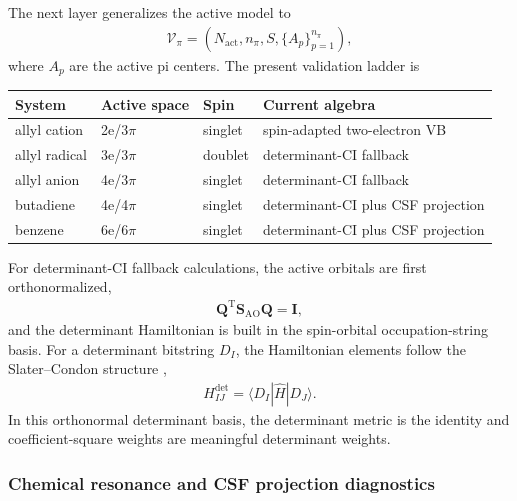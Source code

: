\documentclass[11pt]{article}
\newcommand{\ao}{\mathrm{AO}}
\begin{document}
The next layer generalizes the active model to
\begin{equation}
\begin{aligned}
	\mathcal{V}_{\pi}
	= \left(N_{\mathrm{act}},n_{\pi},S,\{A_p\}_{p=1}^{n_{\pi}}\right),
\end{aligned}
\end{equation}
where $A_p$ are the active pi centers.  The present validation ladder is
\begin{center}
\begin{tabular}{llll}
\toprule
System & Active space & Spin & Current algebra \\
\midrule
allyl cation & 2e/3$\pi$ & singlet & spin-adapted two-electron VB \\
allyl radical & 3e/3$\pi$ & doublet & determinant-CI fallback \\
allyl anion & 4e/3$\pi$ & singlet & determinant-CI fallback \\
butadiene & 4e/4$\pi$ & singlet & determinant-CI plus CSF projection \\
benzene & 6e/6$\pi$ & singlet & determinant-CI plus CSF projection \\
\bottomrule
\end{tabular}
\end{center}

For determinant-CI fallback calculations, the active orbitals are first orthonormalized,
\begin{equation}
\begin{aligned}
	\mathbf{Q}^{\mathrm{T}}\mathbf{S}_{\ao}\mathbf{Q}=\mathbf{I},
\end{aligned}
\end{equation}
and the determinant Hamiltonian is built in the spin-orbital occupation-string basis.  For a determinant bitstring $D_I$, the Hamiltonian elements follow the Slater--Condon structure \cite{SlaterCondon},
\begin{equation}
\begin{aligned}
	H_{IJ}^{\mathrm{det}}
	= \langle D_I|\hat{H}|D_J\rangle.
\end{aligned}
\end{equation}
In this orthonormal determinant basis, the determinant metric is the identity and coefficient-square weights are meaningful determinant weights.

\subsubsection*{Chemical resonance and CSF projection diagnostics}
\end{document}
